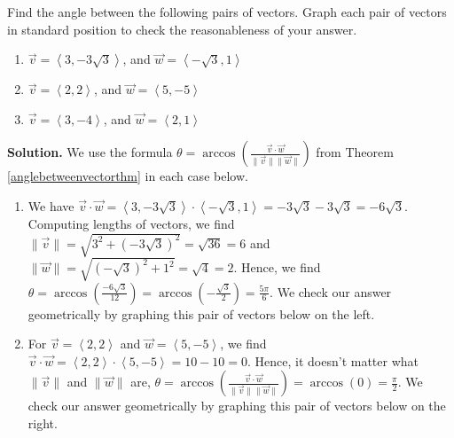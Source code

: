 \documentclass{ximera}
\begin{document}
\begin{example} \label{anglebetweenvectorex}  Find the angle between the following pairs of vectors.  Graph each pair of vectors in standard position to check the reasonableness of your answer.
\begin{enumerate}

\item  \label{anglebetweenvectorexone} $\vec{v} = \left< 3, -3\sqrt{3} \right>$, and $\vec{w} = \left<-\sqrt{3}, 1 \right>$

\item  \label{anglebetweenvectorextwo} $\vec{v} = \left< 2, 2 \right>$, and $\vec{w} = \left<5, -5\right>$

\item \label{anglebetweenvectorexthree} $\vec{v} = \left< 3, -4 \right>$, and $\vec{w} = \left<2, 1\right>$

\end{enumerate}


{\bf Solution.}  We use the formula $\theta = \arccos\left( \frac{\vec{v} \cdot \vec{w}}{\| \vec{v} \| \|\vec{w} \|}\right)$ from Theorem \ref{anglebetweenvectorthm} in each case below.

\begin{enumerate}

\item  We have $\vec{v} \cdot \vec{w} = \left< 3, -3\sqrt{3} \right> \cdot \left<-\sqrt{3}, 1 \right> = -3\sqrt{3} - 3\sqrt{3} = -6\sqrt{3}$.  Computing lengths of vectors, we find  $\| \vec{v} \| = \sqrt{3^2+(-3\sqrt{3})^2} = \sqrt{36} =6$ and $\| \vec{w}\| = \sqrt{(-\sqrt{3})^2+1^2} = \sqrt{4} =2$.  Hence,  we find $\theta = \arccos\left(\frac{-6\sqrt{3}}{12}\right) = \arccos\left(-\frac{\sqrt{3}}{2}\right) = \frac{5\pi}{6}$.  We check our answer geometrically by graphing this pair of vectors below on the left.

\item  For $\vec{v} = \left< 2, 2 \right>$  and $\vec{w} = \left<5, -5\right>$, we find $\vec{v} \cdot \vec{w} = \left< 2, 2 \right> \cdot \left<5, -5\right> = 10-10 = 0$.  Hence, it doesn't matter what $\| \vec{v} \|$ and $\| \vec{w} \|$ are,  $\theta = \arccos\left( \frac{\vec{v} \cdot \vec{w}}{\| \vec{v} \| \|\vec{w} \|}\right) = \arccos(0) = \frac{\pi}{2}$.  We check our answer geometrically by graphing this pair of vectors below on the right.

\begin{center}

\begin{multicols}{2}


\end{multicols}
\end{center}
\end{enumerate}
\end{example}
\end{document}
